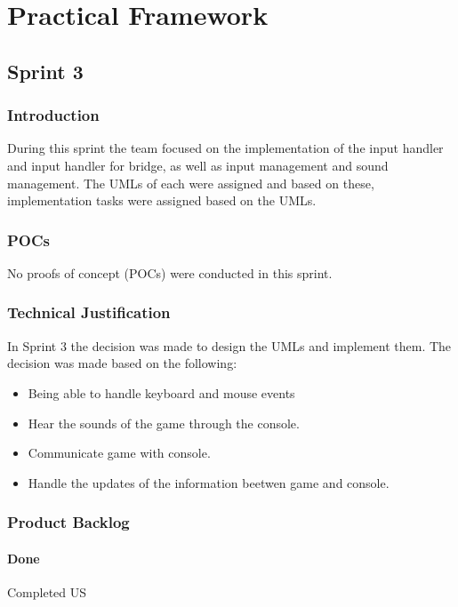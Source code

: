 
\section{Practical Framework}

\subsection{Sprint 3}

\subsubsection{Introduction}
During this sprint the team focused on the implementation of the input handler and input handler for bridge, as well as input management and sound management. The UMLs of each were assigned and based on these, implementation tasks were assigned based on the UMLs.

\subsubsection{POCs}

No proofs of concept (POCs) were conducted in this sprint.

\subsubsection{Technical Justification}
In Sprint 3 the decision was made to design the UMLs and implement them. The decision was made based on the following:

\begin{itemize}
    \item  Being able to handle keyboard and mouse events
    \item  Hear the sounds of the game through the console.
    \item  Communicate game with console.
    \item  Handle the updates of the information beetwen game and console.
\end{itemize}

\newpage

\subsubsection{Product Backlog}

\paragraph{Done}
Completed US

